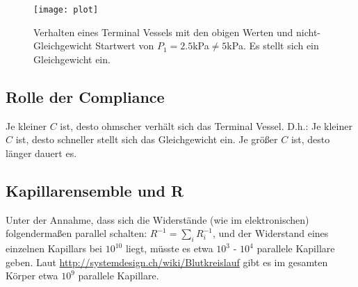 \documentclass[a4paper,12pt]{scrartcl}
\begin{document}
\begin{figure}[!htb]
  \centering
  \texttt{[image: plot]}
  \caption{Verhalten eines Terminal Vessels mit den obigen Werten und nicht-Gleichgewicht Startwert von $P_1 = 2.5$kPa$\neq 5$kPa. Es stellt sich ein Gleichgewicht ein.}
  \label{}
\end{figure}

\subsection*{Rolle der Compliance}
Je kleiner $C$ ist, desto ohmscher verhält sich das Terminal Vessel. D.h.: Je kleiner $C$ ist, desto schneller stellt sich das Gleichgewicht ein. Je größer $C$ ist, desto länger dauert es.


\subsection*{Kapillarensemble und R}
Unter der Annahme, dass sich die Widerstände (wie im elektronischen) folgendermaßen parallel schalten: $R^{-1} = \sum_i R_i^{-1}$, und der Widerstand eines einzelnen Kapillars bei $10^{10}$ liegt, müsste es etwa $10^3$ - $10^4$ parallele Kapillare geben. Laut \url{http://systemdesign.ch/wiki/Blutkreislauf} gibt es im gesamten Körper etwa $10^9$ parallele Kapillare.
\end{document}
